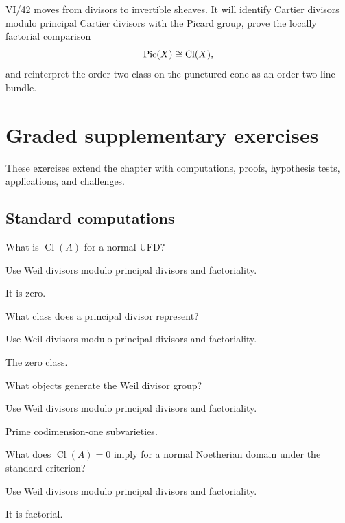 VI/42 moves from divisors to invertible sheaves. It will identify Cartier divisors modulo principal Cartier divisors with the Picard group, prove the locally factorial comparison
\[
  \operatorname{Pic}(X)\cong\operatorname{Cl}(X),
\]
and reinterpret the order-two class on the punctured cone as an order-two line bundle.
\section{Graded supplementary exercises}
These exercises extend the chapter with computations, proofs, hypothesis tests, applications, and challenges.

\subsection*{Standard computations}

\begin{exercise}\label{exr:vi41-expand-01}
What is $\operatorname{Cl}(A)$ for a normal UFD?
\end{exercise}
\begin{hint}
Use Weil divisors modulo principal divisors and factoriality.
\end{hint}
\begin{solution}
It is zero.
\end{solution}

\begin{exercise}\label{exr:vi41-expand-02}
What class does a principal divisor represent?
\end{exercise}
\begin{hint}
Use Weil divisors modulo principal divisors and factoriality.
\end{hint}
\begin{solution}
The zero class.
\end{solution}

\begin{exercise}\label{exr:vi41-expand-03}
What objects generate the Weil divisor group?
\end{exercise}
\begin{hint}
Use Weil divisors modulo principal divisors and factoriality.
\end{hint}
\begin{solution}
Prime codimension-one subvarieties.
\end{solution}

\begin{exercise}[Factoriality]\label{exr:vi41-expand-04}
What does $\operatorname{Cl}(A)=0$ imply for a normal Noetherian domain under the standard criterion?
\end{exercise}
\begin{hint}
Use Weil divisors modulo principal divisors and factoriality.
\end{hint}
\begin{solution}
It is factorial.
\end{solution}

